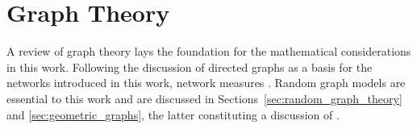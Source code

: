 \chapter{Graph Theory}\label{ch:Graph_theory} 

A review of graph theory lays the foundation for the mathematical
considerations in this work. Following the discussion of directed
graphs as a basis for the networks introduced in this work, network
measures . Random graph models are essential to this work and are
discussed in Sections~\ref{sec:random_graph_theory} and
\ref{sec:geometric_graphs}, the latter constituting a discussion of . 





% 
% 
% 















% 





